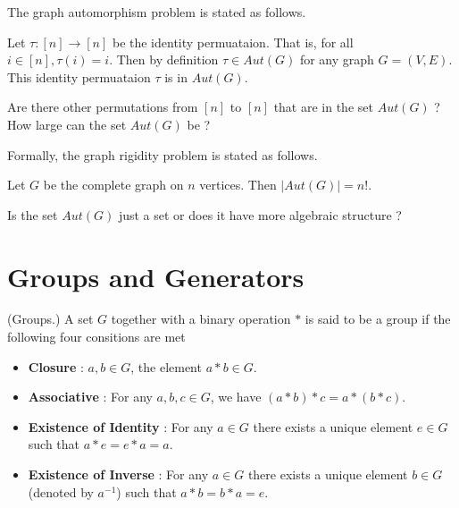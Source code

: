 The graph automorphism problem is stated as follows. 
\begin{center}
\end{center}



\begin{observation}
Let $\tau:[n]\rightarrow[n]$ be the identity permuataion. That is, for all $i\in[n],\tau(i)=i$. Then by definition $\tau\in Aut(G)$ for any graph $G=(V,E)$. This identity permuataion $\tau$ is in $Aut(G)$. 
\end{observation}


Are there other permutations from $[n]$ to $[n]$ that are in the set $Aut(G)$ ? How large can the set $Aut(G)$ be ?

Formally, the graph rigidity problem is stated as follows.
\begin{center}
\end{center}

\begin{observation}
Let $G$ be the complete graph on $n$ vertices. Then $|Aut(G)|=n!$.  
\end{observation}

Is the set $Aut(G)$ just a set or does it have more algebraic structure ? 


\section{Groups and Generators}

\begin{definition}(Groups.)
A set $G$ together with a binary operation $*$ is said to be a group if the following four consitions are met
\begin{itemize}
\item \textbf{Closure} : $a,b\in G$, the element $a*b\in G$.
\item \textbf{Associative} : For any $a,b,c\in G$, we have $(a*b)*c = a*(b*c)$.
\item \textbf{Existence of Identity} : For any $a\in G$ there exists a unique element $e\in G$ such that $a*e =e*a =a$. 
\item \textbf{Existence of Inverse} : For any $a\in G$ there exists a unique element $b\in G$(denoted by $a^{-1}$) such that $a*b =b*a =e$. 
\end{itemize}
\end{definition}

